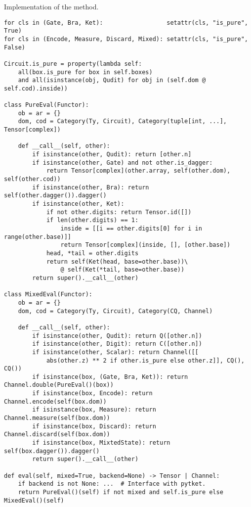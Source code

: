 \begin{python}
{\normalfont Implementation of the  method.}

\begin{verbatim}
for cls in (Gate, Bra, Ket):                  setattr(cls, "is_pure", True)
for cls in (Encode, Measure, Discard, Mixed): setattr(cls, "is_pure", False)

Circuit.is_pure = property(lambda self:
    all(box.is_pure for box in self.boxes)
    and all(isinstance(obj, Qudit) for obj in (self.dom @ self.cod).inside))

class PureEval(Functor):
    ob = ar = {}
    dom, cod = Category(Ty, Circuit), Category(tuple[int, ...], Tensor[complex])

    def __call__(self, other):
        if isinstance(other, Qudit): return [other.n]
        if isinstance(other, Gate) and not other.is_dagger:
            return Tensor[complex](other.array, self(other.dom), self(other.cod))
        if isinstance(other, Bra): return self(other.dagger()).dagger()
        if isinstance(other, Ket):
            if not other.digits: return Tensor.id([])
            if len(other.digits) == 1:
                inside = [[i == other.digits[0] for i in range(other.base)]]
                return Tensor[complex](inside, [], [other.base])
            head, *tail = other.digits
            return self(Ket(head, base=other.base))\
                @ self(Ket(*tail, base=other.base))
        return super().__call__(other)

class MixedEval(Functor):
    ob = ar = {}
    dom, cod = Category(Ty, Circuit), Category(CQ, Channel)

    def __call__(self, other):
        if isinstance(other, Qudit): return Q([other.n])
        if isinstance(other, Digit): return C([other.n])
        if isinstance(other, Scalar): return Channel([[
            abs(other.z) ** 2 if other.is_pure else other.z]], CQ(), CQ())
        if isinstance(box, (Gate, Bra, Ket)): return Channel.double(PureEval()(box))
        if isinstance(box, Encode): return Channel.encode(self(box.dom))
        if isinstance(box, Measure): return Channel.measure(self(box.dom))
        if isinstance(box, Discard): return Channel.discard(self(box.dom))
        if isinstance(box, MixtedState): return self(box.dagger()).dagger()
        return super().__call__(other)

def eval(self, mixed=True, backend=None) -> Tensor | Channel:
    if backend is not None: ...  # Interface with pytket.
    return PureEval()(self) if not mixed and self.is_pure else MixedEval()(self)
\end{verbatim}
\end{python}

